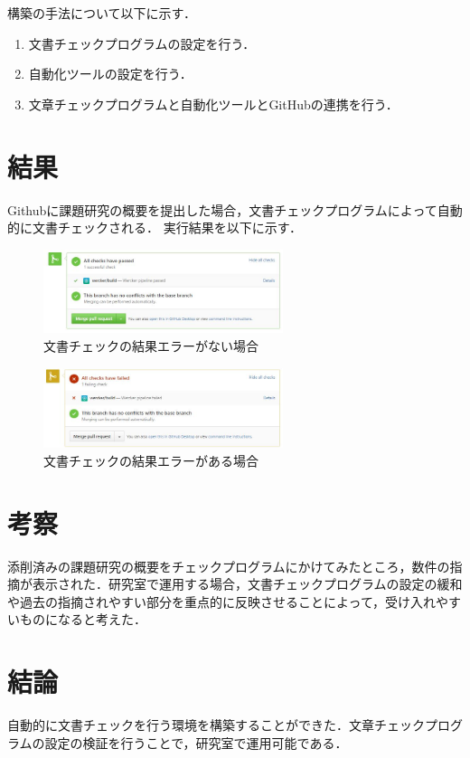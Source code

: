 \documentclass[uplatex,twocolumn,dvipdfmx]{jsarticle}
\begin{document}
構築の手法について以下に示す．
\begin{enumerate}
\item 文書チェックプログラムの設定を行う．
\item 自動化ツールの設定を行う．
\item 文章チェックプログラムと自動化ツールとGitHubの連携を行う．

\end{enumerate}

\section{結果}
Githubに課題研究の概要を提出した場合，文書チェックプログラムによって自動的に文書チェックされる．
\noindent
実行結果を以下に示す．
\noindent
\begin{figure}[h]
\centering
\includegraphics[width=7cm,clip]{3.JPG}
\caption{文書チェックの結果エラーがない場合}\label{}
\end{figure}
\begin{figure}[h]
\centering
\includegraphics[width=7cm,clip]{2.JPG}
\caption{文書チェックの結果エラーがある場合}\label{}
\end{figure}

\section{考察}
添削済みの課題研究の概要をチェックプログラムにかけてみたところ，数件の指摘が表示された．研究室で運用する場合，文書チェックプログラムの設定の緩和や過去の指摘されやすい部分を重点的に反映させることによって，受け入れやすいものになると考えた．


\section{結論}
自動的に文書チェックを行う環境を構築することができた．文章チェックプログラムの設定の検証を行うことで，研究室で運用可能である．




\end{document}
